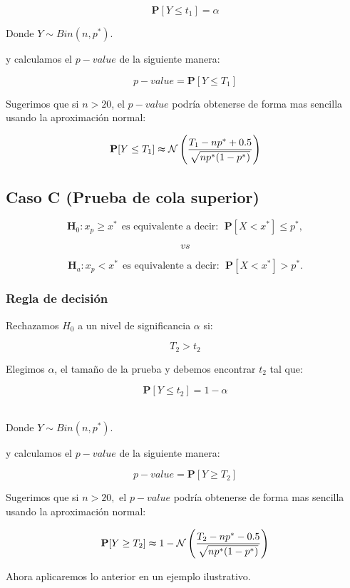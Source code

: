 \documentclass[
  a4paper,
  oneside,
  openany]{book}
\begin{document}
\[\mathbf{P}[Y \leq t_{1}]=\alpha\]

Donde \(Y \sim Bin (n,p^*)\).

y calculamos el \(p-value\) de la siguiente manera:

\[p-value= \mathbf{P}[Y\leq T_{1}]\]

Sugerimos que si \(n > 20\), el \(p-value\) podría obtenerse de forma mas sencilla usando la aproximación normal:

\[\mathbf{P}[Y\leq T_{1}] \thickapprox \mathcal{N} \left(\frac{T_{1}-np^*+0.5}{\sqrt{np^*(1-p^*)}}\right)\]

\hypertarget{caso-c-prueba-de-cola-superior-1}{%
\subsection*{Caso C (Prueba de cola superior)}\label{caso-c-prueba-de-cola-superior-1}}


\[\textbf{H}_0: x_{p} \geq x^* \ \ \mbox{es equivalente a decir}: \ \ \mathbf{P}[X < x^*]\leq p^*,\]

\[vs\]

\[\textbf{H}_a: x_{p} < x^*  \ \ \mbox{es equivalente a decir}: \ \ \mathbf{P}[X < x^*]> p^*.\]

\hypertarget{regla-de-decisiuxf3n-5}{%
\subsubsection*{Regla de decisión}\label{regla-de-decisiuxf3n-5}}


Rechazamos \(H_0\) a un nivel de significancia \(\alpha\) si:

\[T_{2} > t_{2}\]

Elegimos \(\alpha\), el tamaño de la prueba y debemos encontrar \(t_{2}\) tal que:

\[\mathbf{P}[Y \leq t_{2}]=1-\alpha\]~

Donde \(Y \sim Bin (n,p^*)\).

y calculamos el \(p-value\) de la siguiente manera:

\[p-value=\mathbf{P}[Y\geq T_{2}]\]

Sugerimos que si \(n > 20,\) el \(p-value\) podría obtenerse de forma mas sencilla usando la aproximación normal:

\[\mathbf{P}[Y\geq T_{2}] \thickapprox 1- \mathcal{N} \left(\frac{T_{2}-np^*-0.5}{\sqrt{np^*(1-p^*)}}\right)\]

Ahora aplicaremos lo anterior en un ejemplo ilustrativo.
\end{document}
